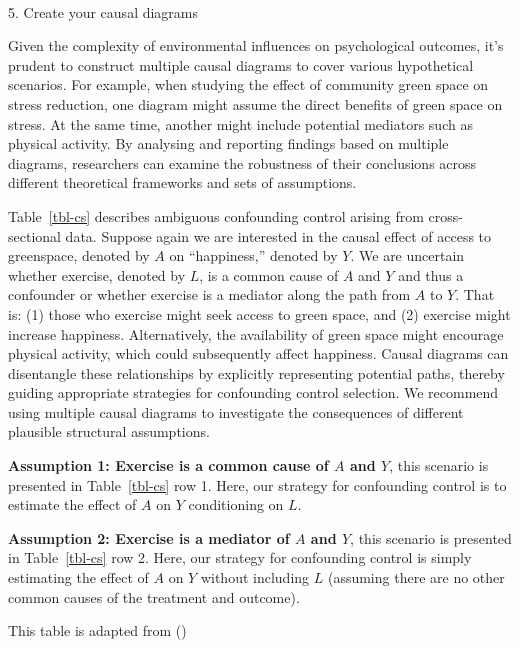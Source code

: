 \documentclass[
  singlecolumn]{article}
\makeatletter
\let\oldparagraph\paragraph
\renewcommand{\paragraph}{
    \@ifstar
      \xxxParagraphStar
      \xxxParagraphNoStar
  }
\newcommand{\xxxParagraphStar}[1]{\oldparagraph*{#1}\mbox{}}
\newcommand{\xxxParagraphNoStar}[1]{\oldparagraph{#1}\mbox{}}
\makeatother
\begin{document}
\paragraph{5. Create your causal
diagrams}\label{create-your-causal-diagrams}

Given the complexity of environmental influences on psychological
outcomes, it's prudent to construct multiple causal diagrams to cover
various hypothetical scenarios. For example, when studying the effect of
community green space on stress reduction, one diagram might assume the
direct benefits of green space on stress. At the same time, another
might include potential mediators such as physical activity. By
analysing and reporting findings based on multiple diagrams, researchers
can examine the robustness of their conclusions across different
theoretical frameworks and sets of assumptions.

Table~\ref{tbl-cs} describes ambiguous confounding control arising from
cross-sectional data. Suppose again we are interested in the causal
effect of access to greenspace, denoted by \(A\) on ``happiness,''
denoted by \(Y\). We are uncertain whether exercise, denoted by \(L\),
is a common cause of \(A\) and \(Y\) and thus a confounder or whether
exercise is a mediator along the path from \(A\) to \(Y\). That is: (1)
those who exercise might seek access to green space, and (2) exercise
might increase happiness. Alternatively, the availability of green space
might encourage physical activity, which could subsequently affect
happiness. Causal diagrams can disentangle these relationships by
explicitly representing potential paths, thereby guiding appropriate
strategies for confounding control selection. We recommend using
multiple causal diagrams to investigate the consequences of different
plausible structural assumptions.

\textbf{Assumption 1: Exercise is a common cause of \(A\) and \(Y\)},
this scenario is presented in Table~\ref{tbl-cs} row 1. Here, our
strategy for confounding control is to estimate the effect of \(A\) on
\(Y\) conditioning on \(L\).

\textbf{Assumption 2: Exercise is a mediator of \(A\) and \(Y\)}, this
scenario is presented in Table~\ref{tbl-cs} row 2. Here, our strategy
for confounding control is simply estimating the effect of \(A\) on
\(Y\) without including \(L\) (assuming there are no other common causes
of the treatment and outcome).

\begin{table}

\caption{\label{tbl-cs}This table is adapted from
()}

\centering{

\examplecrosssection

}

\end{table}%
\end{document}
